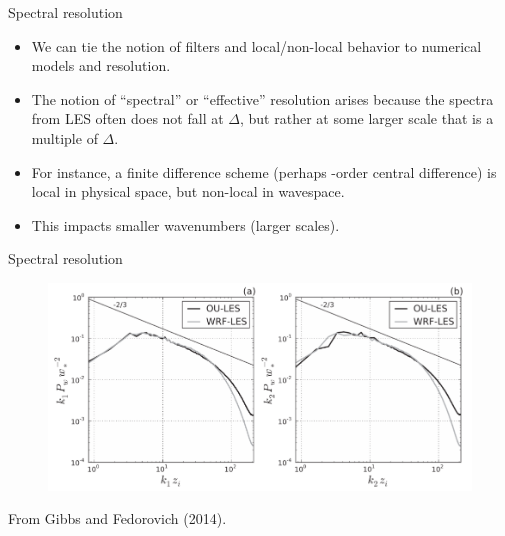 \begin{frame}{Spectral resolution}
\begin{itemize}
	\item We can tie the notion of filters and local/non-local behavior to numerical models and resolution.
	\item The notion of ``spectral'' or ``effective'' resolution arises because the spectra from LES often does not fall at $\Delta$, but rather at some larger scale that is a multiple of $\Delta$.
	\item For instance, a finite difference scheme (perhaps -order central difference) is local in physical space, but non-local in wavespace.
	\item This impacts smaller wavenumbers (larger scales).
\end{itemize}
\end{frame}

\begin{frame}{Spectral resolution}
\begin{figure}
	\includegraphics[width=1\textwidth]{effectiveresolution.png}
\end{figure}
From Gibbs and Fedorovich (2014).
\end{frame}


